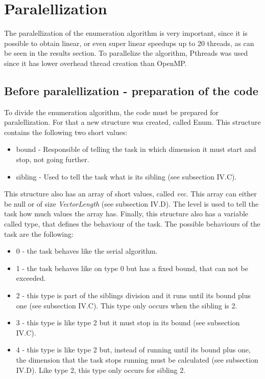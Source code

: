 \documentclass[conference]{IEEEtran}
\begin{document}
\section{Paralellization}
The paralellization of the enumeration algorithm is very important, since it is possible to obtain linear, or even super linear speedups up to 20 threads, as can be seen in the results section. 
To parallelize the algorithm, Pthreads was used since it has lower overhead thread creation than OpenMP.

\subsection{Before paralellization - preparation of the code}
To divide the enumeration algorithm, the code must be prepared for paralellization. For that a new structure was created, called Enum. This structure contains the following two short values:

\begin{itemize}
\item bound - Responsible of telling the task in which dimension it must start and stop, not going further.
\item sibling - Used to tell the task what is its sibling (see subsection IV.C).
\end{itemize}

This structure also has an array of short values, called \emph{vec}. This array can either be null or of size \emph{VectorLength} (see subsection IV.D). The level is used to tell the task how much values the array has.
Finally, this structure also has a variable called type, that defines the behaviour of the task. The possible behaviours of the task are the following:

\begin{itemize}
\item 0 - the task behaves like the serial algorithm.
\item 1 - the task behaves like on type 0 but has a fixed bound, that can not be exceeded.
\item 2 - this type is part of the siblings division and it runs until its bound plus one (see subsection IV.C). This type only occurs when the sibling is 2.
\item 3 - this type is like type 2 but it must stop in its bound (see subsection IV.C).
\item 4 - this type is like type 2 but, instead of running until its bound plus one, the dimension that the task stops running must be calculated (see subsection IV.D). Like type 2, this type only occurs for sibling 2.
\end{itemize}
\end{document}
